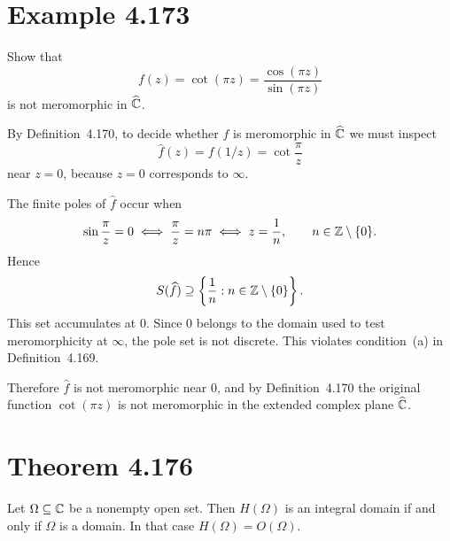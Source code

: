 \documentclass{article}
\newcommand{\Chat}{\widehat{\C}}
\begin{document}
\section{Example 4.173}

Show that
\[
  f(z)=\cot(\pi z)=\frac{\cos(\pi z)}{\sin(\pi z)}
\]
is not meromorphic in $\Chat$.

\begin{solution}
  By Definition~4.170, to decide whether $f$ is meromorphic in $\Chat$ we must
  inspect
  \[
    \widehat f(z)=f(1/z)=\cot\frac{\pi}{z}
  \]
  near $z=0$, because $z=0$ corresponds to $\infty$.

  The finite poles of $\widehat f$ occur when
  \[
    \sin\frac{\pi}{z}=0
    \iff
    \frac{\pi}{z}=n\pi
    \iff
    z=\frac1n,
    \qquad n\in\mathbb{Z}\setminus\{0\}.
  \]
  Hence
  \[
    S(\widehat f)\supseteq
    \left\{\frac1n:n\in\mathbb{Z}\setminus\{0\}\right\}.
  \]
  This set accumulates at $0$. Since $0$ belongs to the domain used to test
  meromorphicity at $\infty$, the pole set is not discrete. This violates
  condition~(a) in Definition~4.169.

  Therefore $\widehat f$ is not meromorphic near $0$, and by
  Definition~4.170 the original function $\cot(\pi z)$ is not meromorphic in
  the extended complex plane $\Chat$.
\end{solution}

\section{Theorem 4.176}

Let $\Omega\subseteq\mathbb{C}$ be a nonempty open set. Then $H(\Omega)$ is an
integral domain if and only if $\Omega$ is a domain. In that case
$H(\Omega)=O(\Omega)$.
\end{document}

